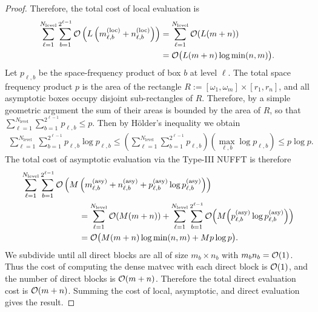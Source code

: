 \begin{proof}
    Therefore, the total cost of local evaluation is 
    \begin{align}
        \sum_{\ell=1}^{N_{\text{level}}} \sum_{b=1}^{2^{\ell-1}} \mathcal{O}\left(L\left(m_{\ell,b}^{(\text{loc})} + n_{\ell,b}^{(\text{loc})}\right)\right)
        &= \sum_{\ell=1}^{N_{\text{level}}} \mathcal{O}(L(m + n)) \\
        &= \mathcal{O}\big(L (m + n) \log \min(n,m)\big).
    \end{align}
    Let $p_{\ell,b}$ be the space-frequency product of box $b$ at level $\ell$.
    The total space frequency product $p$ is the area of the rectangle $R :=
    [\omega_1, \omega_m] \times [r_1, r_n]$, and all asymptotic boxes occupy
    disjoint sub-rectangles of $R$. Therefore, by a simple geometric argument
    the sum of their areas is bounded by the area of $R$, so that
    $\sum_{\ell=1}^{N_{\text{level}}} \sum_{b=1}^{2^{\ell-1}} p_{\ell,b} \leq
    p$. Then by H\"older's inequality we obtain 
    \begin{align} 
        \sum_{\ell=1}^{N_{\text{level}}} \sum_{b=1}^{2^{\ell-1}} p_{\ell,b} \log p_{\ell,b}
        \leq \left( \sum_{\ell=1}^{N_{\text{level}}} \sum_{b=1}^{2^{\ell-1}} p_{\ell,b} \right) \left(\max_{\ell,b} \log p_{\ell,b} \right) 
        \leq p \log p.
    \end{align}
    The total cost of asymptotic evaluation via the Type-III NUFFT is therefore
    \begin{align}
        & \sum_{\ell=1}^{N_{\text{level}}} \sum_{b=1}^{2^{\ell-1}} \bO\left(M\left(m_{\ell,b}^{(\text{asy})} + n_{\ell,b}^{(\text{asy})} + p_{\ell,b}^{(\text{asy})} \log p_{\ell,b}^{(\text{asy})} \right)\right) \\
        &\hspace*{0.2\textwidth} = \sum_{\ell=1}^{N_{\text{level}}} \bO(M(m + n)) + \sum_{\ell=1}^{N_{\text{level}}} \sum_{b=1}^{2^{\ell-1}} \bO\Big(M\Big(p_{\ell,b}^{(\text{asy})} \log p_{\ell,b}^{(\text{asy})}\Big)\Big) \\
        &\hspace*{0.2\textwidth} = \bO\big(M (m + n) \log \min(n,m) + Mp\log p\big).
    \end{align}
    We subdivide until all direct blocks are all of size $m_b \times n_b$ with
    $m_bn_b = \mathcal{O}(1)$. Thus the cost of computing the dense matvec with each
    direct block is $\mathcal{O}(1)$, and the number of direct blocks is $\mathcal{O}(m + n)$.
    Therefore the total direct evaluation cost is $\mathcal{O}(m + n)$. Summing the cost
    of local, asymptotic, and direct evaluation gives the result.
\end{proof}

